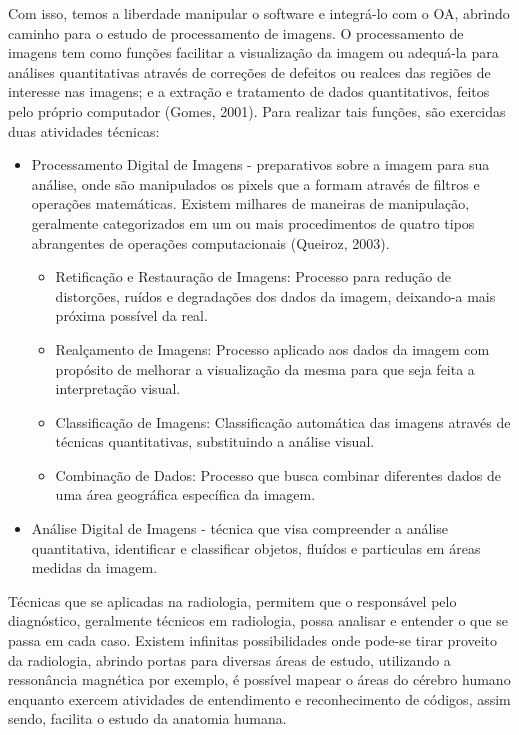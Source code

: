 \documentclass[12pt,openright,oneside,a4paper,english,french,spanish,brazil]{unifil}
\begin{document}
Com isso, temos a liberdade manipular o software e integrá-lo com o OA, abrindo caminho para o estudo de processamento de imagens. O processamento de imagens tem como funções facilitar a visualização da imagem ou adequá-la para análises quantitativas através de correções de defeitos ou realces das regiões de interesse nas imagens; e a extração e tratamento de dados quantitativos, feitos pelo próprio computador (Gomes, 2001). Para realizar tais funções, são exercidas duas atividades técnicas:
\begin{itemize}
\item Processamento Digital de Imagens - preparativos sobre a imagem para sua análise, onde são manipulados os pixels que a formam através de filtros e operações matemáticas. Existem milhares de maneiras de manipulação, geralmente categorizados em um ou mais procedimentos de quatro tipos abrangentes de operações computacionais (Queiroz, 2003).
\begin{itemize}
\item Retificação e Restauração de Imagens: Processo para redução de distorções, ruídos e degradações dos dados da imagem, deixando-a mais próxima possível da real.
\item Realçamento de Imagens: Processo aplicado aos dados da imagem com propósito de melhorar a visualização da mesma para que seja feita a interpretação visual.
\item Classificação de Imagens: Classificação automática das imagens através de técnicas quantitativas, substituindo a análise visual.
\item Combinação de Dados: Processo que busca combinar diferentes dados de uma área geográfica específica da imagem.
\end{itemize}

\item Análise Digital de Imagens - técnica que visa compreender a análise quantitativa, identificar e classificar objetos, fluídos e particulas em áreas medidas da imagem. 
\end{itemize}
Técnicas que se aplicadas na radiologia, permitem que o responsável pelo diagnóstico, geralmente técnicos em radiologia, possa analisar e entender o que se passa em cada caso. Existem infinitas possibilidades onde pode-se tirar proveito da radiologia, abrindo portas para diversas áreas de estudo, utilizando a ressonância magnética por exemplo,  é possível mapear o áreas do cérebro humano enquanto exercem atividades de entendimento e reconhecimento de códigos, assim sendo, facilita o estudo da anatomia humana.
\end{document}
